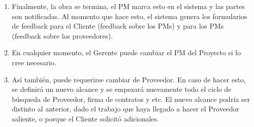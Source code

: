 \begin{enumerate}
    \item Finalmente, la obra se termina, el PM marca esto en el sistema y las partes 
    son notificadas. Al momento que hace esto, el sistema genera los formularios 
    de feedback para el Cliente (feedback sobre los PMs) y para los PMs (feedback sobre 
    los proveedores). 
    
    \item En cualquier momento, el Gerente puede cambiar el PM del Proyecto si 
    lo cree necesario. 
    
    \item Así también, puede requerirse cambiar de Proveedor. En caso de hacer 
    esto, se definirá un nuevo alcance y se empezará nuevamente todo el ciclo 
    de búsqueda de Proveedor, firma de contratos y etc. El nuevo alcance 
    podría ser distinto al anterior, dado el trabajo que haya llegado a 
    hacer el Proveedor saliente, o porque el Cliente solicitó adicionales. 
\end{enumerate}
